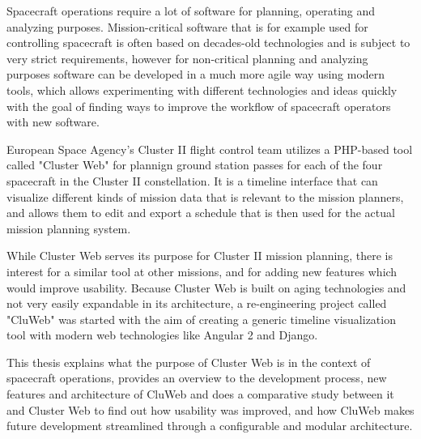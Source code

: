 Spacecraft operations require a lot of software for planning, operating and analyzing purposes. Mission-critical software that is for example used for controlling spacecraft is often based on decades-old technologies and is subject to very strict requirements, however for non-critical planning and analyzing purposes software can be developed in a much more agile way using modern tools, which allows experimenting with different technologies and ideas quickly with the goal of finding ways to improve the workflow of spacecraft operators with new software.

European Space Agency's Cluster II flight control team utilizes a PHP-based tool called "Cluster Web" for plannign ground station passes for each of the four spacecraft in the Cluster II constellation. It is a timeline interface that can visualize different kinds of mission data that is relevant to the mission planners, and allows them to edit and export a schedule that is then used for the actual mission planning system.

While Cluster Web serves its purpose for Cluster II mission planning, there is interest for a similar tool at other missions, and for adding new features which would improve usability. Because Cluster Web is built on aging technologies and not very easily expandable in its architecture, a re-engineering project called "CluWeb" was started with the aim of creating a generic timeline visualization tool with modern web technologies like Angular 2 and Django.

This thesis explains what the purpose of Cluster Web is in the context of spacecraft operations, provides an overview to the development process, new features and architecture of CluWeb and does a comparative study between it and Cluster Web to find out how usability was improved, and how CluWeb makes future development streamlined through a configurable and modular architecture.